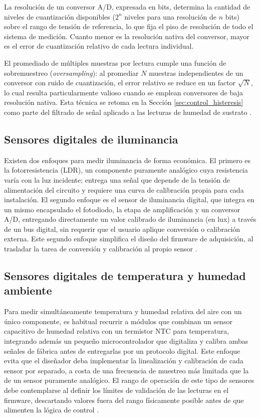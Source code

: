 La resolución de un conversor A/D, expresada en bits, determina la cantidad de niveles de cuantización disponibles ($2^n$ niveles para una resolución de $n$ bits) sobre el rango de tensión de referencia, lo que fija el piso de resolución de todo el sistema de medición. Cuanto menor es la resolución nativa del conversor, mayor es el error de cuantización relativo de cada lectura individual.

El promediado de múltiples muestras por lectura cumple una función de sobremuestreo (\textit{oversampling}): al promediar $N$ muestras independientes de un conversor con ruido de cuantización, el error relativo se reduce en un factor $\sqrt{N}$, lo cual resulta particularmente valioso cuando se emplean conversores de baja resolución nativa. Esta técnica se retoma en la Sección \ref{sec:control_histeresis} como parte del filtrado de señal aplicado a las lecturas de humedad de sustrato \cite{sobremuestreo_researchgate}.

\subsection{Sensores digitales de iluminancia}
\label{subsec:sensores_luz}

Existen dos enfoques para medir iluminancia de forma económica. El primero es la fotorresistencia (LDR), un componente puramente analógico cuya resistencia varía con la luz incidente; entrega una señal que depende de la tensión de alimentación del circuito y requiere una curva de calibración propia para cada instalación. El segundo enfoque es el sensor de iluminancia digital, que integra en un mismo encapsulado el fotodiodo, la etapa de amplificación y un conversor A/D, entregando directamente un valor calibrado de iluminancia (en lux) a través de un bus digital, sin requerir que el usuario aplique conversión o calibración externa. Este segundo enfoque simplifica el diseño del firmware de adquisición, al trasladar la tarea de conversión y calibración al propio sensor \cite{sensor_iluminancia}.

\subsection{Sensores digitales de temperatura y humedad ambiente}
\label{subsec:sensores_temp_hum}

Para medir simultáneamente temperatura y humedad relativa del aire con un único componente, es habitual recurrir a módulos que combinan un sensor capacitivo de humedad relativa con un termistor NTC para temperatura, integrando además un pequeño microcontrolador que digitaliza y calibra ambas señales de fábrica antes de entregarlas por un protocolo digital. Este enfoque evita que el diseñador deba implementar la linealización y calibración de cada sensor por separado, a costa de una frecuencia de muestreo más limitada que la de un sensor puramente analógico. El rango de operación de este tipo de sensores debe contemplarse al definir los límites de validación de las lecturas en el firmware, descartando valores fuera del rango físicamente posible antes de que alimenten la lógica de control \cite{aosong_dht22}.


